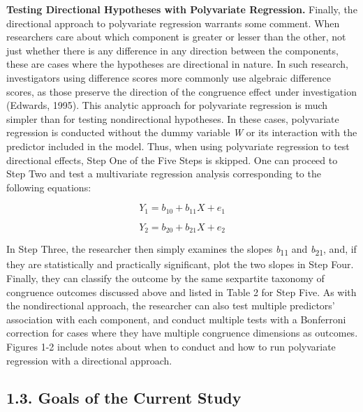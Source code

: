 \documentclass[authordate, meta, issue]{jote-new-article}
\begin{document}
	\textbf{Testing Directional Hypotheses with Polyvariate Regression. }Finally, the directional approach to polyvariate regression warrants some comment. When researchers care about which component is greater or lesser than the other, not just whether there is any difference in any direction between the components, these are cases where the hypotheses are directional in nature. In such research, investigators using difference scores more commonly use algebraic difference scores, as those preserve the direction of the congruence effect under investigation (Edwards, 1995). This analytic approach for polyvariate regression is much simpler than for testing nondirectional hypotheses. In these cases, polyvariate regression is conducted without the dummy variable \emph{W} or its interaction with the predictor included in the model. Thus, when using polyvariate regression to test directional effects, Step One of the Five Steps is skipped. One can proceed to Step Two and test a multivariate regression analysis corresponding to the following equations:



	\begin{equation}
		Y_1= b_{10}+b_{11}X+e_1
	\end{equation}



	\begin{equation}
		Y_2= b_{20}+b_{21}X+e_2
	\end{equation}



	In Step Three, the researcher then simply examines the slopes \emph{b}\textsubscript{11 }and \emph{b}\textsubscript{21}, and, if they are statistically and practically significant, plot the two slopes in Step Four. Finally, they can classify the outcome by the same sexpartite taxonomy of congruence outcomes discussed above and listed in Table 2 for Step Five. As with the nondirectional approach, the researcher can also test multiple predictors' association with each component, and conduct multiple tests with a Bonferroni correction for cases where they have multiple congruence dimensions as outcomes. Figures 1-2 include notes about when to conduct and how to run polyvariate regression with a directional approach.



	\subsection{1.3. Goals of the Current Study}
\end{document}
